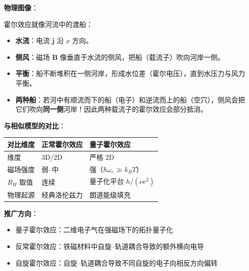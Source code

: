 \begin{insightbox}[物理图像与模型关联]
\textbf{物理图像}：

霍尔效应就像河流中的渡船：
\begin{itemize}[nosep]
    \item \textbf{水流}：电流 $\mathbf{j}$ 沿 $x$ 方向。
    \item \textbf{侧风}：磁场 $\mathbf{B}$ 像垂直于水流的侧风，把船（载流子）吹向河岸一侧。
    \item \textbf{平衡}：船不断堆积在一侧河岸，形成水位差（霍尔电压），直到水压力与风力平衡。
    \item \textbf{两种船}：若河中有顺流而下的船（电子）和逆流而上的船（空穴），侧风会把它们吹向\textbf{同一侧}河岸！因此两种载流子的霍尔效应会部分抵消。
\end{itemize}

\textbf{与相似模型的对比}：
\begin{center}
\begin{tabular}{lll}
\toprule
\textbf{对比维度} & \textbf{正常霍尔效应} & \textbf{量子霍尔效应} \\
\midrule
维度 & 3D/2D & 严格 2D \\
磁场强度 & 弱--中 & 强（$\hbar\omega_c\gg k_BT$） \\
$R_H$ 取值 & 连续 & 量子化平台 $h/(\nu e^2)$ \\
物理起源 & 经典洛伦兹力 & 朗道能级填充 \\
\bottomrule
\end{tabular}
\end{center}

\textbf{推广方向}：
\begin{itemize}[nosep]
    \item 量子霍尔效应：二维电子气在强磁场下的拓扑量子化
    \item 反常霍尔效应：铁磁材料中自旋--轨道耦合导致的额外横向电导
    \item 自旋霍尔效应：自旋--轨道耦合导致不同自旋的电子向相反方向偏转
\end{itemize}
\end{insightbox}

